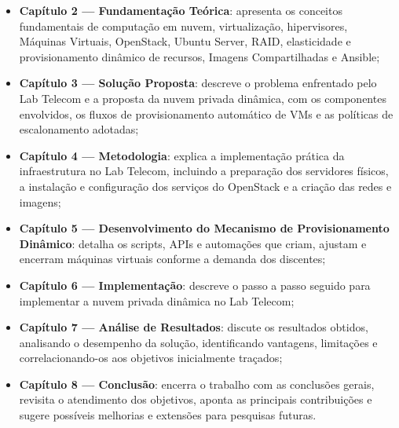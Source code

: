 \begin{itemize}
    \item \textbf{Capítulo 2 — Fundamentação Teórica}: apresenta os conceitos fundamentais de computação em nuvem, virtualização, hipervisores, Máquinas Virtuais, OpenStack, Ubuntu Server, RAID,  elasticidade e provisionamento dinâmico de recursos, Imagens Compartilhadas e Ansible;
    \item \textbf{Capítulo 3 — Solução Proposta}: descreve o problema enfrentado pelo Lab Telecom e a proposta da nuvem privada dinâmica, com os componentes envolvidos, os fluxos de provisionamento automático de VMs e as políticas de escalonamento adotadas;
    \item \textbf{Capítulo 4 — Metodologia}: explica a implementação prática da infraestrutura no Lab Telecom, incluindo a preparação dos servidores físicos, a instalação e configuração dos serviços do OpenStack e a criação das redes e imagens;
    \item \textbf{Capítulo 5 — Desenvolvimento do Mecanismo de Provisionamento Dinâmico}: detalha os scripts, APIs e automações que criam, ajustam e encerram máquinas virtuais conforme a demanda dos discentes;
    \item \textbf{Capítulo 6 — Implementação}: descreve o passo a passo seguido para implementar a nuvem privada dinâmica no Lab Telecom;
    \item \textbf{Capítulo 7 — Análise de Resultados}: discute os resultados obtidos, analisando o desempenho da solução, identificando vantagens, limitações e correlacionando-os aos objetivos inicialmente traçados;
    \item \textbf{Capítulo 8 — Conclusão}: encerra o trabalho com as conclusões gerais, revisita o atendimento dos objetivos, aponta as principais contribuições e sugere possíveis melhorias e extensões para pesquisas futuras.
\end{itemize}
